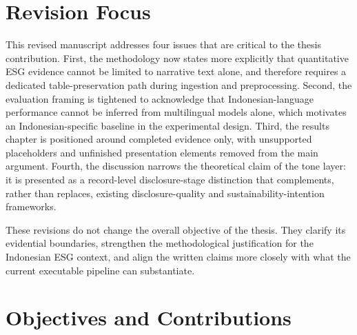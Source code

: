 \documentclass[english, online, cse, master]{dithesis}
\begin{document}
\section{Revision Focus}

This revised manuscript addresses four issues that are critical to the thesis contribution. First, the methodology now states more explicitly that quantitative ESG evidence cannot be limited to narrative text alone, and therefore requires a dedicated table-preservation path during ingestion and preprocessing. Second, the evaluation framing is tightened to acknowledge that Indonesian-language performance cannot be inferred from multilingual models alone, which motivates an Indonesian-specific baseline in the experimental design. Third, the results chapter is positioned around completed evidence only, with unsupported placeholders and unfinished presentation elements removed from the main argument. Fourth, the discussion narrows the theoretical claim of the tone layer: it is presented as a record-level disclosure-stage distinction that complements, rather than replaces, existing disclosure-quality and sustainability-intention frameworks.

These revisions do not change the overall objective of the thesis. They clarify its evidential boundaries, strengthen the methodological justification for the Indonesian ESG context, and align the written claims more closely with what the current executable pipeline can substantiate.

\section{Objectives and Contributions}
\end{document}
